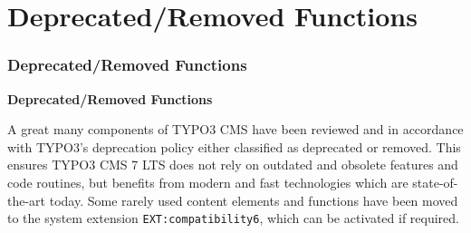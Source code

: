 %

\section{Deprecated/Removed Functions}
\begin{frame}[fragile]
	\frametitle{Deprecated/Removed Functions}

	\begin{center}\huge{\color{typo3darkgrey}\textbf{Deprecated/Removed Functions}}\end{center}

	A great many components of TYPO3 CMS have been reviewed and in accordance with
	TYPO3's deprecation policy either classified as deprecated or removed.\newline
	This ensures TYPO3 CMS 7 LTS does not rely on outdated and obsolete features and
	code routines, but benefits from modern and fast technologies which are
	state-of-the-art today.\newline
	Some rarely used content elements and functions have been moved to the system
	extension \texttt{EXT:compatibility6}, which can be activated if required.

\end{frame}

